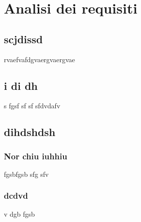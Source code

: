 \section{Analisi dei requisiti}
	\subsection{scjdissd}
	rvaefvafdgvaergvaergvae
	\subsection{ i di dh}
	 s fgsf sf sf sfdvdafv
	\subsection{dihdshdsh}
		\subsubsection{Nor chiu iuhhiu}
		fgsbfgsb sfg sfv 
		\subsubsection{dcdvd}
		v dgb fgsb
		


